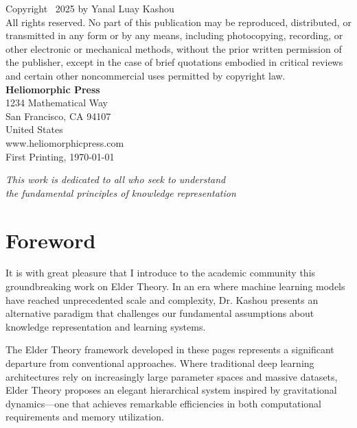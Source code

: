 \documentclass[11pt,twoside]{book}
\newcounter{unit}
\begin{document}
\vspace{2cm}
\noindent
Copyright \textcopyright~2025 by Yanal Luay Kashou\\[5mm]
\noindent
All rights reserved. No part of this publication may be reproduced, distributed, or transmitted in any form or by any means, including photocopying, recording, or other electronic or mechanical methods, without the prior written permission of the publisher, except in the case of brief quotations embodied in critical reviews and certain other noncommercial uses permitted by copyright law.\\[5mm]

\noindent
\textbf{Heliomorphic Press}\\
1234 Mathematical Way\\
San Francisco, CA 94107\\
United States\\
www.heliomorphicpress.com\\[5mm]

\noindent 
First Printing, \today

\vspace{4cm}
\begin{center}
    \textit{This work is dedicated to all who seek to understand\\
    the fundamental principles of knowledge representation}
\end{center}

\newpage

\tableofcontents

\listoffigures

\listoftables

\chapter*{Foreword}

It is with great pleasure that I introduce to the academic community this groundbreaking work on Elder Theory. In an era where machine learning models have reached unprecedented scale and complexity, Dr. Kashou presents an alternative paradigm that challenges our fundamental assumptions about knowledge representation and learning systems.

The Elder Theory framework developed in these pages represents a significant departure from conventional approaches. Where traditional deep learning architectures rely on increasingly large parameter spaces and massive datasets, Elder Theory proposes an elegant hierarchical system inspired by gravitational dynamics—one that achieves remarkable efficiencies in both computational requirements and memory utilization.
\end{document}
